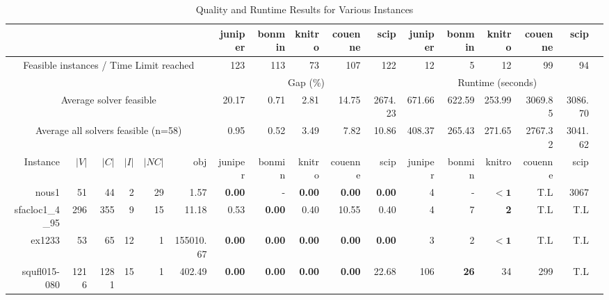  
\begin{table*}[t] 
\footnotesize 
\caption{Quality and Runtime Results for Various Instances} 
\begin{tabular}{|r|r|r|r|r||r||r|r|r|r|r||r|r|r|r|r|r|} 
\hline 
 \multicolumn{6}{|c||}{} & juniper    & bonmin  & knitro & couenne        & scip            & juniper          & bonmin  & knitro  & couenne         & scip \\  
    \hline 
    \hline 
\multicolumn{6}{|c||}{Feasible instances / Time Limit reached} & 123 & 113 & 73 & 107 & 122 & 12 & 5 & 12 & 99 & 94  \\ 
\hline 
\multicolumn{6}{|c||}{} & \multicolumn{5}{c||}{Gap (\%)} &  \multicolumn{5}{c|}{Runtime (seconds)} \\ \hline 
\multicolumn{6}{|c||}{Average solver feasible} & 20.17 & 0.71 & 2.81 & 14.75 & 2674.23 & 671.66 & 622.59 & 253.99 & 3069.85 & 3086.70  \\ 
\multicolumn{6}{|c||}{Average all solvers feasible (n=58)} &  0.95 & 0.52 & 3.49 & 7.82 & 10.86 & 408.37 & 265.43 & 271.65 & 2767.32 & 3041.62  \\ 
\hline 
Instance   & $|V|$& $|C|$& $|I|$& $|NC|$ & obj  & juniper    & bonmin  & knitro & couenne        & scip            & juniper          & bonmin  & knitro  & couenne         & scip \\ 
\hline 
                            nous1 &           51 &           44 &           2 &          29 &              1.57 & \textbf{0.00} &            - & \textbf{0.00} & \textbf{0.00} & \textbf{0.00} &            4 &                  - &         $\bm{< 1}$ &          T.L &         3067 \\ 
                  sfacloc1\_4\_95 &          296 &          355 &           9 &          15 &             11.18 &          0.53 &\textbf{0.00} &          0.40 &         10.55 &          0.40 &            4 &                  7 &         \textbf{2} &          T.L &          T.L \\ 
                           ex1233 &           53 &           65 &          12 &           1 &         155010.67 & \textbf{0.00} &\textbf{0.00} & \textbf{0.00} & \textbf{0.00} & \textbf{0.00} &            3 &                  2 &         $\bm{< 1}$ &          T.L &          T.L \\ 
                     squfl015-080 &         1216 &         1281 &          15 &           1 &            402.49 & \textbf{0.00} &\textbf{0.00} & \textbf{0.00} & \textbf{0.00} &         22.68 &          106 &        \textbf{26} &                 34 &          299 &          T.L \\ 

\end{tabular}
\end{table*}
